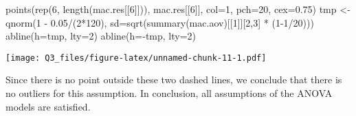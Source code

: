 \documentclass[
]{article}
\newenvironment{Shaded}{\begin{snugshade}}{\end{snugshade}}
\newcommand{\AttributeTok}[1]{\textcolor[rgb]{0.77,0.63,0.00}{#1}}
\newcommand{\DecValTok}[1]{\textcolor[rgb]{0.00,0.00,0.81}{#1}}
\newcommand{\FloatTok}[1]{\textcolor[rgb]{0.00,0.00,0.81}{#1}}
\newcommand{\FunctionTok}[1]{\textcolor[rgb]{0.00,0.00,0.00}{#1}}
\newcommand{\NormalTok}[1]{#1}
\newcommand{\OtherTok}[1]{\textcolor[rgb]{0.56,0.35,0.01}{#1}}
\newcommand{\SpecialCharTok}[1]{\textcolor[rgb]{0.00,0.00,0.00}{#1}}
\begin{document}
\begin{Shaded}
\begin{Highlighting}[]
\FunctionTok{points}\NormalTok{(}\FunctionTok{rep}\NormalTok{(}\DecValTok{6}\NormalTok{, }\FunctionTok{length}\NormalTok{(mac.res[[}\DecValTok{6}\NormalTok{]])), mac.res[[}\DecValTok{6}\NormalTok{]], }\AttributeTok{col=}\DecValTok{1}\NormalTok{, }\AttributeTok{pch=}\DecValTok{20}\NormalTok{, }\AttributeTok{cex=}\FloatTok{0.75}\NormalTok{)}
\NormalTok{tmp }\OtherTok{\textless{}{-}} \FunctionTok{qnorm}\NormalTok{(}\DecValTok{1} \SpecialCharTok{{-}} \FloatTok{0.05}\SpecialCharTok{/}\NormalTok{(}\DecValTok{2}\SpecialCharTok{*}\DecValTok{120}\NormalTok{), }\AttributeTok{sd=}\FunctionTok{sqrt}\NormalTok{(}\FunctionTok{summary}\NormalTok{(mac.aov)[[}\DecValTok{1}\NormalTok{]][}\DecValTok{2}\NormalTok{,}\DecValTok{3}\NormalTok{] }\SpecialCharTok{*}\NormalTok{ (}\DecValTok{1{-}1}\SpecialCharTok{/}\DecValTok{20}\NormalTok{)))}
\FunctionTok{abline}\NormalTok{(}\AttributeTok{h=}\NormalTok{tmp, }\AttributeTok{lty=}\DecValTok{2}\NormalTok{)}
\FunctionTok{abline}\NormalTok{(}\AttributeTok{h=}\SpecialCharTok{{-}}\NormalTok{tmp, }\AttributeTok{lty=}\DecValTok{2}\NormalTok{)}
\end{Highlighting}
\end{Shaded}

\texttt{[image: Q3\_files/figure-latex/unnamed-chunk-11-1.pdf]}

Since there is no point outside these two dashed lines, we conclude that
there is no outliers for this assumption. In conclusion, all assumptions
of the ANOVA models are satisfied.
\end{document}
